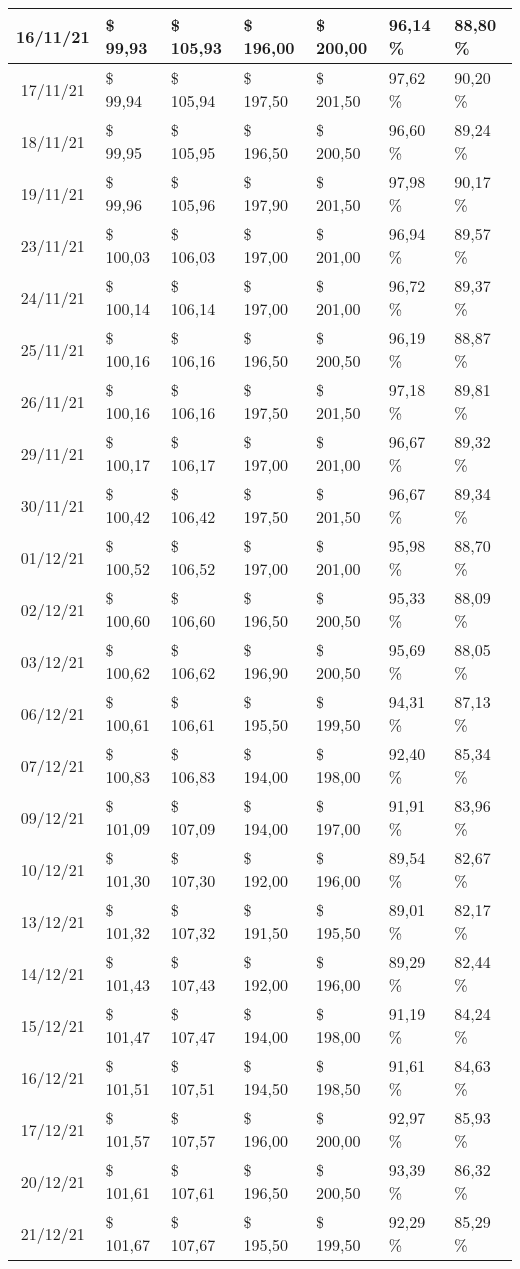 \begin{center}
\begin{longtable}{|c|p{1.5cm}|p{1.5cm}|p{1.5cm}|p{1.5cm}|p{1.5cm}|p{1.5cm}|}
16/11/21 & \$ 99,93 & \$ 105,93 & \$ 196,00 & \$ 200,00 & 96,14 \% & 88,80 \% \\ \hline
17/11/21 & \$ 99,94 & \$ 105,94 & \$ 197,50 & \$ 201,50 & 97,62 \% & 90,20 \% \\ \hline
18/11/21 & \$ 99,95 & \$ 105,95 & \$ 196,50 & \$ 200,50 & 96,60 \% & 89,24 \% \\ \hline
19/11/21 & \$ 99,96 & \$ 105,96 & \$ 197,90 & \$ 201,50 & 97,98 \% & 90,17 \% \\ \hline
23/11/21 & \$ 100,03 & \$ 106,03 & \$ 197,00 & \$ 201,00 & 96,94 \% & 89,57 \% \\ \hline
24/11/21 & \$ 100,14 & \$ 106,14 & \$ 197,00 & \$ 201,00 & 96,72 \% & 89,37 \% \\ \hline
25/11/21 & \$ 100,16 & \$ 106,16 & \$ 196,50 & \$ 200,50 & 96,19 \% & 88,87 \% \\ \hline
26/11/21 & \$ 100,16 & \$ 106,16 & \$ 197,50 & \$ 201,50 & 97,18 \% & 89,81 \% \\ \hline
29/11/21 & \$ 100,17 & \$ 106,17 & \$ 197,00 & \$ 201,00 & 96,67 \% & 89,32 \% \\ \hline
30/11/21 & \$ 100,42 & \$ 106,42 & \$ 197,50 & \$ 201,50 & 96,67 \% & 89,34 \% \\ \hline
01/12/21 & \$ 100,52 & \$ 106,52 & \$ 197,00 & \$ 201,00 & 95,98 \% & 88,70 \% \\ \hline
02/12/21 & \$ 100,60 & \$ 106,60 & \$ 196,50 & \$ 200,50 & 95,33 \% & 88,09 \% \\ \hline
03/12/21 & \$ 100,62 & \$ 106,62 & \$ 196,90 & \$ 200,50 & 95,69 \% & 88,05 \% \\ \hline
06/12/21 & \$ 100,61 & \$ 106,61 & \$ 195,50 & \$ 199,50 & 94,31 \% & 87,13 \% \\ \hline
07/12/21 & \$ 100,83 & \$ 106,83 & \$ 194,00 & \$ 198,00 & 92,40 \% & 85,34 \% \\ \hline
09/12/21 & \$ 101,09 & \$ 107,09 & \$ 194,00 & \$ 197,00 & 91,91 \% & 83,96 \% \\ \hline
10/12/21 & \$ 101,30 & \$ 107,30 & \$ 192,00 & \$ 196,00 & 89,54 \% & 82,67 \% \\ \hline
13/12/21 & \$ 101,32 & \$ 107,32 & \$ 191,50 & \$ 195,50 & 89,01 \% & 82,17 \% \\ \hline
14/12/21 & \$ 101,43 & \$ 107,43 & \$ 192,00 & \$ 196,00 & 89,29 \% & 82,44 \% \\ \hline
15/12/21 & \$ 101,47 & \$ 107,47 & \$ 194,00 & \$ 198,00 & 91,19 \% & 84,24 \% \\ \hline
16/12/21 & \$ 101,51 & \$ 107,51 & \$ 194,50 & \$ 198,50 & 91,61 \% & 84,63 \% \\ \hline
17/12/21 & \$ 101,57 & \$ 107,57 & \$ 196,00 & \$ 200,00 & 92,97 \% & 85,93 \% \\ \hline
20/12/21 & \$ 101,61 & \$ 107,61 & \$ 196,50 & \$ 200,50 & 93,39 \% & 86,32 \% \\ \hline
21/12/21 & \$ 101,67 & \$ 107,67 & \$ 195,50 & \$ 199,50 & 92,29 \% & 85,29 \% \\ \hline
\end{longtable}
\end{center}

